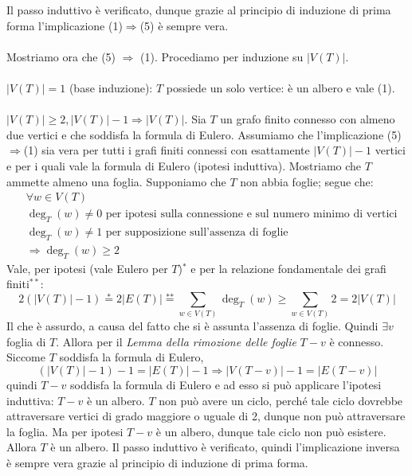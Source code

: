 \documentclass[oneside]{book}
\begin{document}
\begin{tcolorbox}[
        enhanced,
        breakable,
        title={Teorema di caratterizzazione degli alberi finiti con formula di Eulero}
    ]
    Il passo induttivo è verificato, dunque grazie al principio di induzione di prima forma
    l'implicazione (1)$\Rightarrow$(5) è sempre vera.
    \\\\
    Mostriamo ora che (5) $\Rightarrow$ (1). Procediamo per induzione su $|V(T)|$.
    \\\\
    $|V(T)|=1$ (base induzione): $T$ possiede un solo vertice: è un albero e vale (1).
    \\\\
    $|V(T)|\geq 2, |V(T)|-1\Longrightarrow|V(T)|$. Sia $T$ un grafo finito
    connesso con almeno due vertici e che soddisfa la formula di Eulero. Assumiamo che l'implicazione
    (5)$\Rightarrow$(1) sia vera per tutti i grafi finiti connessi con esattamente
    $|V(T)|-1$ vertici e per i quali vale la formula di Eulero (ipotesi induttiva).
    Mostriamo che $T$ ammette almeno una foglia.
    Supponiamo che $T$ non abbia foglie; segue che:
    \begin{align*}
        &\forall w\in V(T)\\
        &\deg_T(w)\not = 0 \text{ per ipotesi sulla connessione e sul numero minimo di vertici}\\
        &\deg_T(w)\not = 1 \text{ per supposizione sull'assenza di foglie}\\
        &\Longrightarrow \deg_T(w)\geq 2
    \end{align*}
    Vale, per ipotesi (vale Eulero per $T$)$^*$ e per la relazione fondamentale dei grafi finiti$^{**}$:
    \[ 2(|V(T)|-1)\stackrel{\text{*}}{=}2|E(T)|\stackrel{\text{**}}{=}\sum_{w\in V(T)}\deg_T(w)\geq \sum_{w\in V(T)}2=2|V(T)| \]
    Il che è assurdo, a causa del fatto che si è assunta l'assenza di foglie.
    Quindi $\exists v$ foglia di $T$. Allora per il \textit{Lemma della rimozione delle foglie}
    $T-v$ è connesso.
    Siccome $T$ soddisfa la formula di Eulero,
    \[ (|V(T)|-1) -1 = |E(T)|-1 \Rightarrow |V(T-v)|-1=|E(T-v)|\]
    quindi $T-v$ soddisfa la formula di Eulero
    e ad esso si può applicare l'ipotesi induttiva: $T-v$ è un albero. $T$ non
    può avere un ciclo, perché tale ciclo dovrebbe attraversare vertici di grado
    maggiore o uguale di 2, dunque non può attraversare la foglia. Ma per ipotesi
    $T-v$ è un albero, dunque tale ciclo non può esistere. Allora $T$ è un albero.
    Il passo induttivo è verificato, quindi l'implicazione inversa è sempre vera
    grazie al principio di induzione di prima forma.
    \cvd
\end{tcolorbox}
\end{document}
